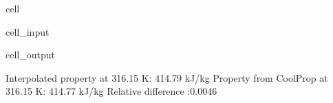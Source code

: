 \documentclass[letterpaper,10pt,english]{jupyterBook}
\begin{document}
\begin{sphinxuseclass}{cell}
\begin{sphinxVerbatimInput}
\begin{sphinxuseclass}{cell_input}
\begin{sphinxVerbatim}[commandchars=\\\{\}]
    
      
\end{sphinxVerbatim}

\end{sphinxuseclass}\end{sphinxVerbatimInput}
\begin{sphinxVerbatimOutput}

\begin{sphinxuseclass}{cell_output}
\begin{sphinxVerbatim}[commandchars=\\\{\}]
Interpolated property at 316.15 K: 414.79 kJ/kg
Property from CoolProp at 316.15 K: 414.77 kJ/kg
Relative difference :0.0046 \PYGZpc{}
\end{sphinxVerbatim}

\end{sphinxuseclass}\end{sphinxVerbatimOutput}

\end{sphinxuseclass}
\end{document}
